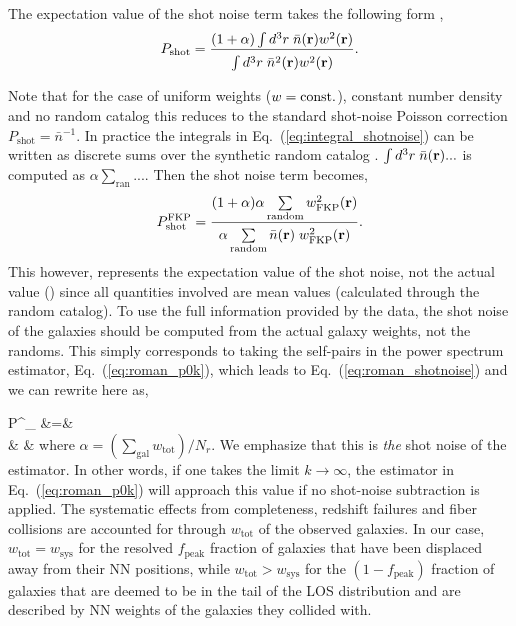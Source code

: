 The expectation value of the shot noise term takes the following form \citep{Feldman:1994aa},
\begin{equation} \label{eq:integral_shotnoise}
P_\mathrm{shot} = \frac{ (1+\alpha) \int d^3r \;\bar{n}({\bf r})w^2({\bf r})}{\int\limits^{ } d^3r \;\bar{n}^2({\bf r})w^2({\bf r})}. 
\end{equation}

\noindent Note that for the case of uniform weights ($w={\rm const.}$), 
constant number density and no random catalog this reduces to the standard 
shot-noise Poisson correction $P_\mathrm{shot} =\bar{n}^{-1}$. 
In practice the integrals in Eq.~(\ref{eq:integral_shotnoise}) can be 
written as discrete sums over the synthetic random catalog 
\citep{Feldman:1994aa}. $\int d^3r \; \bar{n}({\bf r}) ...$ 
is computed as $\alpha \sum_{\mathrm{ran}}...$. Then the shot noise term 
becomes, 
\begin{equation} \label{eq:fkp_shotnoise}
P^\mathrm{FKP}_\mathrm{shot} = \frac{(1+\alpha) \alpha \sum\limits_{\mathrm{random}} w_\mathrm{FKP}^2({\bf r})}{\alpha \sum\limits_{\mathrm{random}}^{ } \bar{n}({\bf r})\; w_\mathrm{FKP}^2({\bf r})}.
\end{equation} 
This however, represents the expectation value of the shot noise, not the actual value 
(\citealt{Hamilton:1997aa}) since all quantities involved are mean values (calculated through the random catalog). To use the full information provided by the data, the shot noise of the galaxies should be computed from the actual galaxy weights, not the randoms. This simply corresponds to taking the self-pairs in the power spectrum estimator, Eq.~(\ref{eq:roman_p0k}), which leads to Eq.~(\ref{eq:roman_shotnoise}) and we can rewrite here as,

\beqa \label{eq:ourshot}
P^_ &=& \nonumber  \\ & & 
\eeqa
where $\alpha = (\sum_\mathrm{gal} w_\mathrm{tot} )/N_r$. 
We emphasize that this is {\em the} shot noise of the estimator. 
In other words, if one takes the limit $k \to \infty$, the 
estimator in Eq.~(\ref{eq:roman_p0k}) will approach this 
value if no shot-noise subtraction is applied. The systematic 
effects from completeness, redshift failures and fiber collisions are accounted for through $w_\mathrm{tot}$ of the observed galaxies. In our case, $w_\mathrm{tot}=w_\mathrm{sys}$ for the resolved $f_\mathrm{peak}$ fraction of galaxies that have been displaced away from their NN positions, while $w_\mathrm{tot}>w_\mathrm{sys}$ for the $(1-f_\mathrm{peak})$ fraction of galaxies that are deemed to be in the tail of the LOS distribution and are described by NN weights of the galaxies they collided with. 


